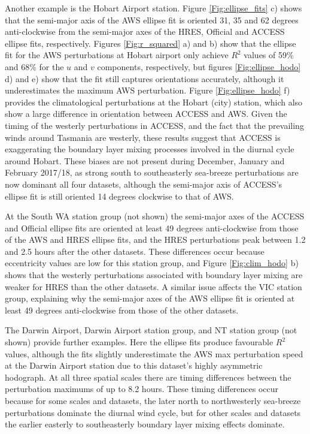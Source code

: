 \documentclass[twocol]{ametsoc}
\begin{document}
Another example is the Hobart Airport station. Figure \ref{Fig:ellipse_fits} c) shows that the semi-major axis of the AWS ellipse fit is oriented 31, 35 and 62 degrees anti-clockwise from the semi-major axes of the HRES, Official and ACCESS ellipse fits, respectively. Figures \ref{Fig:r_squared} a) and b) show that the ellipse fit for the AWS perturbations at Hobart airport only achieve $R^2$ values of 59\% and 68\% for the $u$ and $v$ components, respectively, but figures \ref{Fig:ellipse_hodo} d) and e) show that the fit still captures orientations accurately, although it underestimates the maximum AWS perturbation. Figure \ref{Fig:ellipse_hodo} f) provides the climatological perturbations at the Hobart (city) station, which also show a large difference in orientation between ACCESS and AWS. Given the timing of the westerly perturbations in ACCESS, and the fact that the prevailing winds around Tasmania are westerly, these results suggest that ACCESS is exaggerating the boundary layer mixing processes involved in the diurnal cycle around Hobart. These biases are not present during December, January and February 2017/18, as strong south to southeasterly sea-breeze perturbations are now dominant all four datasets, although the semi-major axis of ACCESS's ellipse fit is still oriented 14 degrees clockwise to that of AWS. 

At the South WA station group (not shown) the semi-major axes of the ACCESS and Official ellipse fits are oriented at least 49 degrees anti-clockwise from those of the AWS and HRES ellipse fits, and the HRES perturbations peak between 1.2 and 2.5 hours after the other datasets. These differences occur because eccentricity values are low for this station group, and Figure \ref{Fig:clim_hodo} b) shows that the westerly perturbations associated with boundary layer mixing are weaker for HRES than the other datasets. A similar issue affects the VIC station group, explaining why the semi-major axes of the AWS ellipse fit is oriented at least 49 degrees anti-clockwise from those of the other datasets. 

The Darwin Airport, Darwin Airport station group, and NT station group (not shown) provide further examples. Here the ellipse fits produce favourable $R^2$ values, although the fits slightly underestimate the AWS max perturbation speed at the Darwin Airport station due to this dataset's highly asymmetric hodograph. At all three spatial scales there are timing differences between the perturbation maximums of up to 8.2 hours. These timing differences occur because for some scales and datasets, the later north to northwesterly sea-breeze perturbations dominate the diurnal wind cycle, but for other scales and datasets the earlier easterly to southeasterly boundary layer mixing effects dominate.
\end{document}
